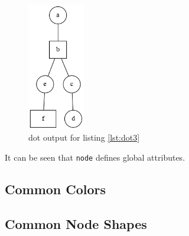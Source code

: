 \documentclass{article}
\begin{document}
	\begin{figure}[H]
		\begin{center}
			\includegraphics[width=25mm]{figure3.png}
		\end{center}
		\caption{dot output for listing \ref{lst:dot3} }
		\label{fig:png3}
	\end{figure}

	It can be seen that \lstinline{node} defines global attributes.

	\subsection{Common Colors}

	\subsection{Common Node Shapes}
\end{document}
